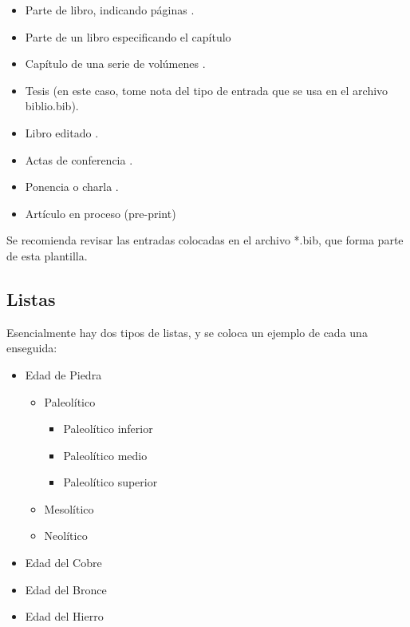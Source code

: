 \begin{itemize}
\item Parte de libro, indicando páginas \citep[págs. 10--13]{bib5}. 
\item Parte de un libro especificando el capítulo \citep[cap. 4]{bib_chap}
\item Capítulo de una serie de volúmenes \citep{bib7}.
\item Tesis \citep{bib_tesis} (en este caso, tome nota del tipo de entrada que se usa en el archivo biblio.bib).
\item Libro editado \citep{bib6}.
\item Actas de conferencia \citep{bib7}.
\item Ponencia o charla \citep{bib8}.
\item Artículo en proceso (pre-print) \citep{bib10}
\end{itemize}

Se recomienda revisar las entradas colocadas en el archivo *.bib, que forma parte de esta plantilla. 


\subsection{Listas}

Esencialmente hay dos tipos de listas, y se coloca un ejemplo de cada una enseguida: 

\begin{itemize}
\item Edad de Piedra
	\begin{itemize}
	\item Paleolítico
		\begin{itemize}
		\item Paleolítico inferior
		\item Paleolítico medio
		\item Paleolítico superior
	\end{itemize}
	\item Mesolítico
	\item Neolítico
	\end{itemize}
\item Edad del Cobre
\item Edad del Bronce
\item Edad del Hierro
\end{itemize} 

